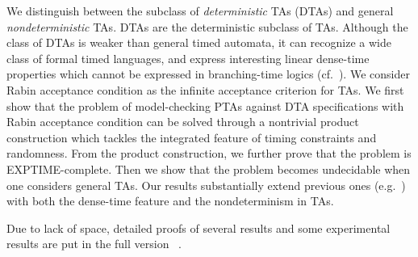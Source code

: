 {} We distinguish between the subclass of \emph{deterministic} TAs (DTAs) and general \emph{nondeterministic} TAs.
DTAs are the deterministic subclass of TAs.
Although the class of DTAs is weaker than general timed automata, it can recognize a wide class of formal timed languages, and express interesting linear dense-time properties which cannot be expressed in branching-time logics (cf.~\cite{DBLP:journals/tse/DonatelliHS09}).
We consider Rabin acceptance condition as the infinite acceptance criterion for TAs.
We first show that the problem of model-checking PTAs against DTA specifications with Rabin acceptance condition
can be solved through a nontrivial product construction which tackles the integrated feature of timing constraints and randomness. From the product construction, we further prove that the problem is EXPTIME-complete.
Then we show that the problem becomes undecidable when one considers general TAs.
Our results substantially extend previous ones (e.g.~\cite{DBLP:conf/qest/Sproston11}) with both the dense-time feature and the nondeterminism in TAs.

Due to lack of space, detailed proofs of several results and some experimental results are put in the full version ~\cite{DBLP:journals/corr/abs-1712-00275}.



